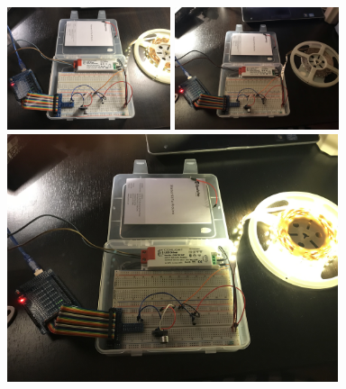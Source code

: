 \documentclass[a4paper,11pt]{article}
\begin{document}
\begin{center}
\includegraphics[width=0.36\textwidth]{clapping_lamp_on.jpeg}
\includegraphics[width=0.36\textwidth]{clapping_lamp_off.jpg}
\includegraphics[width=0.729\textwidth]{clapping_lamp_full.jpeg}
\end{center}
\end{document}
